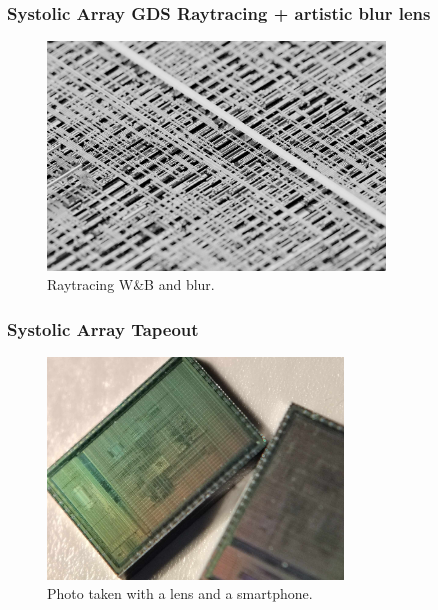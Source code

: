 \begin{frame}
	\frametitle{Systolic Array GDS Raytracing + artistic blur lens}
	\begin{figure}[H]
		\centering
		\includegraphics[width=0.8\textwidth]{teras.png}
		\caption{Raytracing W\&B and blur.}
		\label{fig:teras_raytracing}
	\end{figure}
\end{frame}

\begin{frame}
\frametitle{Systolic Array Tapeout}
\begin{figure}[H]
	\centering
	\includegraphics[width=0.7\textwidth]{tapeout_pic.jpg}
	\caption{Photo taken with a lens and a smartphone.}
\end{figure}
\end{frame}
